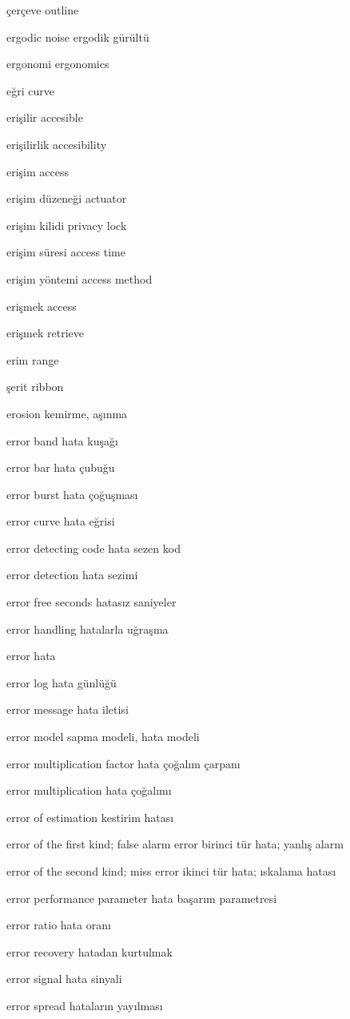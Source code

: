\documentclass[12pt,fleqn]{article}\usepackage{../../common}
\begin{document}
çerçeve outline

ergodic noise ergodik gürültü

ergonomi ergonomics

eğri curve

erişilir accesible

erişilirlik accesibility

erişim access

erişim düzeneği actuator

erişim kilidi privacy lock

erişim süresi access time

erişim yöntemi access method

erişmek access

erişmek retrieve

erim range

şerit ribbon

erosion kemirme, aşınma

error band hata kuşağı

error bar hata çubuğu

error burst hata çoğuşması

error curve hata eğrisi

error detecting code hata sezen kod

error detection hata sezimi

error free seconds hatasız saniyeler

error handling hatalarla uğraşma

error hata

error log hata günlüğü

error message hata iletisi

error model sapma modeli, hata modeli

error multiplication factor hata çoğalım çarpanı

error multiplication hata çoğalımı

error of estimation kestirim hatası

error of the first kind; false alarm error birinci tür hata; yanlış alarm

error of the second kind; miss error ikinci tür hata; ıskalama hatası

error performance parameter hata başarım parametresi

error ratio hata oranı

error recovery hatadan kurtulmak

error signal hata sinyali

error spread hataların yayılması
\end{document}
